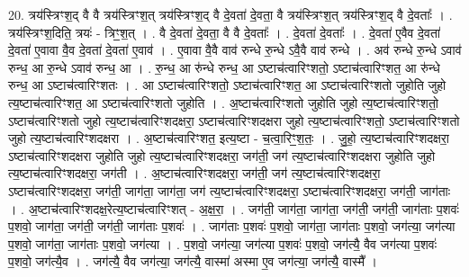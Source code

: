 \documentclass[17pt]{extarticle}
\begin{document}
20. त्रय॑स्त्रिꣳश॒द् वै वै त्रय॑स्त्रिꣳश॒त् त्रय॑स्त्रिꣳश॒द् वै दे॒वता॑ दे॒वता॒ वै त्रय॑स्त्रिꣳश॒त् त्रय॑स्त्रिꣳश॒द् वै दे॒वताः᳚ । . त्रय॑स्त्रिꣳश॒दिति॒ त्रयः॑ - त्रिꣳ॒॒श॒त् । . वै दे॒वता॑ दे॒वता॒ वै वै दे॒वताः᳚ । . दे॒वता॑ दे॒वताः᳚ । . दे॒वता॑ ए॒वैव दे॒वता॑ दे॒वता॑ ए॒वावा वै॒व दे॒वता॑ दे॒वता॑ ए॒वाव॑ । . ए॒वावा वै॒वै वाव॑ रुन्धे रु॒न्धे ऽवै॒वै वाव॑ रुन्धे । . अव॑ रुन्धे रु॒न्धे ऽवाव॑ रुन्ध॒ आ रु॒न्धे ऽवाव॑ रुन्ध॒ आ । . रु॒न्ध॒ आ रु॑न्धे रुन्ध॒ आ ऽष्टाच॑त्वारिꣳशतो॒ ऽष्टाच॑त्वारिꣳशत॒ आ रु॑न्धे रुन्ध॒ आ ऽष्टाच॑त्वारिꣳशतः । . आ ऽष्टाच॑त्वारिꣳशतो॒ ऽष्टाच॑त्वारिꣳशत॒ आ ऽष्टाच॑त्वारिꣳशतो जुहोति जुहो त्य॒ष्टाच॑त्वारिꣳशत॒ आ ऽष्टाच॑त्वारिꣳशतो जुहोति । . अ॒ष्टाच॑त्वारिꣳशतो जुहोति जुहो त्य॒ष्टाच॑त्वारिꣳशतो॒ ऽष्टाच॑त्वारिꣳशतो जुहो त्य॒ष्टाच॑त्वारिꣳशदक्षरा॒ ऽष्टाच॑त्वारिꣳशदक्षरा जुहो त्य॒ष्टाच॑त्वारिꣳशतो॒ ऽष्टाच॑त्वारिꣳशतो जुहो
त्य॒ष्टाच॑त्वारिꣳशदक्षरा । . अ॒ष्टाच॑त्वारिꣳशत॒ इत्य॒ष्टा - च॒त्वा॒रिꣳ॒॒श॒तः॒ । . जु॒हो॒ त्य॒ष्टाच॑त्वारिꣳशदक्षरा॒ ऽष्टाच॑त्वारिꣳशदक्षरा जुहोति जुहो त्य॒ष्टाच॑त्वारिꣳशदक्षरा॒ जग॑ती॒ जग॑ त्य॒ष्टाच॑त्वारिꣳशदक्षरा जुहोति जुहो त्य॒ष्टाच॑त्वारिꣳशदक्षरा॒ जग॑ती । . अ॒ष्टाच॑त्वारिꣳशदक्षरा॒ जग॑ती॒ जग॑ त्य॒ष्टाच॑त्वारिꣳशदक्षरा॒ ऽष्टाच॑त्वारिꣳशदक्षरा॒ जग॑ती॒ जाग॑ता॒ जाग॑ता॒ जग॑ त्य॒ष्टाच॑त्वारिꣳशदक्षरा॒ ऽष्टाच॑त्वारिꣳशदक्षरा॒ जग॑ती॒ जाग॑ताः । . अ॒ष्टाच॑त्वारिꣳशदक्ष॒रेत्य॒ष्टाच॑त्वारिꣳशत् - अ॒क्ष॒रा॒ । . जग॑ती॒ जाग॑ता॒ जाग॑ता॒ जग॑ती॒ जग॑ती॒ जाग॑ताः प॒शवः॑ प॒शवो॒ जाग॑ता॒ जग॑ती॒ जग॑ती॒ जाग॑ताः प॒शवः॑ । . जाग॑ताः प॒शवः॑ प॒शवो॒ जाग॑ता॒ जाग॑ताः प॒शवो॒ जग॑त्या॒ जग॑त्या प॒शवो॒ जाग॑ता॒ जाग॑ताः प॒शवो॒ जग॑त्या । . प॒शवो॒ जग॑त्या॒ जग॑त्या प॒शवः॑ प॒शवो॒ जग॑त्यै॒ वैव जग॑त्या प॒शवः॑ प॒शवो॒ जग॑त्यै॒व । . जग॑त्यै॒ वैव जग॑त्या॒ जग॑त्यै॒ वास्मा॑ अस्मा ए॒व जग॑त्या॒ जग॑त्यै॒ वास्मै᳚ । \newline
\end{document}
